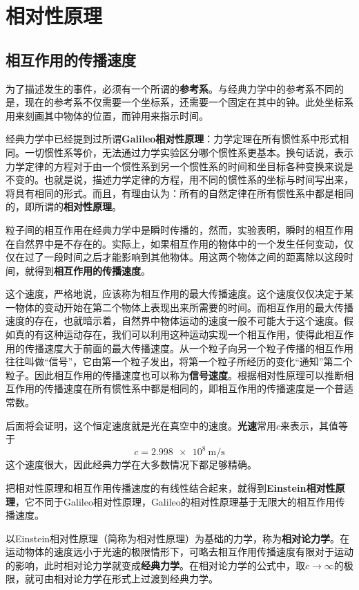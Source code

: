 \chapter{相对性原理}

\section{相互作用的传播速度}

为了描述发生的事件，必须有一个所谓的{\bf 参考系}。与经典力学中的参考系不同的是，现在的参考系不仅需要一个坐标系，还需要一个固定在其中的钟。此处坐标系用来刻画其中物体的位置，而钟用来指示时间。

经典力学中已经提到过所谓{\bf Galileo相对性原理}：力学定理在所有惯性系中形式相同。一切惯性系等价，无法通过力学实验区分哪个惯性系更基本。换句话说，表示力学定律的方程对于由一个惯性系到另一个惯性系的时间和坐目标各种变换来说是不变的。也就是说，描述力学定律的方程，用不同的惯性系的坐标与时间写出来，将具有相同的形式。而且，有理由认为：所有的自然定律在所有惯性系中都是相同的，即所谓的{\bf 相对性原理}。

粒子间的相互作用在经典力学中是瞬时传播的，然而，实验表明，瞬时的相互作用在自然界中是不存在的。实际上，如果相互作用的物体中的一个发生任何变动，仅仅在过了一段时间之后才能影响到其他物体。用这两个物体之间的距离除以这段时间，就得到{\bf 相互作用的传播速度}。

这个速度，严格地说，应该称为相互作用的最大传播速度。这个速度仅仅决定于某一物体的变动开始在第二个物体上表现出来所需要的时间。而相互作用的最大传播速度的存在，也就暗示着，自然界中物体运动的速度一般不可能大于这个速度。假如真的有这种运动存在，我们可以利用这种运动实现一个相互作用，使得此相互作用的传播速度大于前面的最大传播速度。从一个粒子向另一个粒子传播的相互作用往往叫做“信号”，它由第一个粒子发出，将第一个粒子所经历的变化“通知”第二个粒子。因此相互作用的传播速度也可以称为{\bf 信号速度}。根据相对性原理可以推断相互作用的传播速度在所有惯性系中都是相同的，即相互作用的传播速度是一个普适常数。

后面将会证明，这个恒定速度就是光在真空中的速度。{\bf 光速}常用$c$来表示，其值等于
\begin{equation*}
	c = \SI{2.998e8}{\metre/\second}
\end{equation*}
这个速度很大，因此经典力学在大多数情况下都足够精确。

把相对性原理和相互作用传播速度的有线性结合起来，就得到{\bf Einstein相对性原理}，它不同于Galileo相对性原理，Galileo的相对性原理基于无限大的相互作用传播速度。

以Einstein相对性原理（简称为相对性原理）为基础的力学，称为{\bf 相对论力学}。在运动物体的速度远小于光速的极限情形下，可略去相互作用传播速度有限对于运动的影响，此时相对论力学就变成{\bf 经典力学}。在相对论力学的公式中，取$c \to \infty$的极限，就可由相对论力学在形式上过渡到经典力学。

